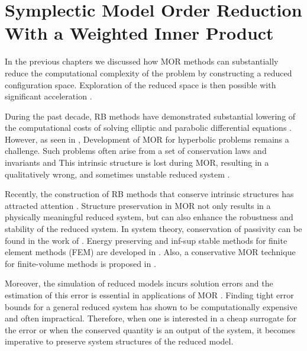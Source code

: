 \chapter{Symplectic Model Order Reduction With a Weighted Inner Product} \label{chapter:5}

In the previous chapters we discussed how MOR methods can substantially reduce the computational complexity of the problem by constructing a reduced configuration space. Exploration of the reduced space is then possible with significant acceleration \cite{hesthaven2015certified,Haasdonk2017}.

During the past decade, RB methods have demonstrated substantial lowering of the computational costs of solving elliptic and parabolic differential equations \cite{ito1998reduced,ito2001reduced}. However, as seen in , Development of MOR for hyperbolic problems remains a challenge. Such problems often arise from a set of conservation laws and invariants and This intrinsic structure is lost during MOR, resulting in a qualitatively wrong, and sometimes unstable reduced system \cite{Amsallem:2014ef}.

Recently, the construction of RB methods that conserve intrinsic structures has attracted attention \cite{doi:10.1137/17M1111991,kalashnikova2014stabilization,farhat2015structure,doi:10.1137/110836742,doi:10.1137/140959602,beattie2011structure,doi:10.1137/140978922}. Structure preservation in MOR not only results in a physically meaningful reduced system, but can also enhance the robustness and stability of the reduced system. In system theory, conservation of passivity can be found in the work of \cite{polyuga2010structure,gugercin2012structure}. Energy preserving and inf-sup stable methods for finite element methods (FEM) are developed in \cite{farhat2015structure,ballarin2015supremizer}. Also, a conservative MOR technique for finite-volume methods is proposed in \cite{1711.11550}.

Moreover, the simulation of reduced models incurs solution errors and the estimation of this error is essential in applications of MOR \cite{HaasdonkOhlberger11,RuinerEtAl12,BhattEtAl18}. Finding tight error bounds for a general reduced system has shown to be computationally expensive and often impractical. Therefore, when one is interested in a cheap surrogate for the error or when the conserved quantity is an output of the system, it becomes imperative to preserve system structures of the reduced model.

